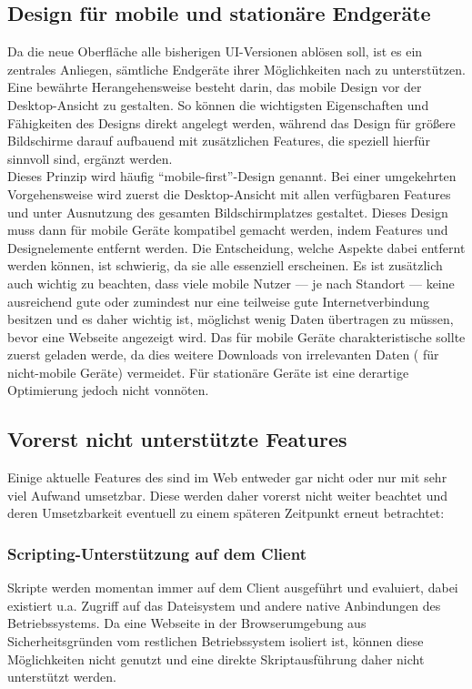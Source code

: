 \subsection{Design für mobile und stationäre Endgeräte}
Da die neue Oberfläche alle bisherigen UI-Versionen ablösen soll, ist es ein zentrales Anliegen, sämtliche Endgeräte ihrer Möglichkeiten nach zu unterstützen. Eine bewährte Herangehensweise besteht darin, das mobile Design vor der Desktop-Ansicht zu gestalten. So können die wichtigsten Eigenschaften und Fähigkeiten des Designs direkt angelegt werden, während das Design für größere Bildschirme darauf aufbauend mit zusätzlichen Features, die speziell hierfür sinnvoll sind, ergänzt werden.\\ Dieses Prinzip wird häufig \enquote{mobile-first}-Design genannt. Bei einer umgekehrten Vorgehensweise wird zuerst die Desktop-Ansicht mit allen verfügbaren Features und unter Ausnutzung des gesamten Bildschirmplatzes gestaltet. Dieses Design muss dann für mobile Geräte kompatibel gemacht werden, indem Features und Designelemente entfernt werden. Die Entscheidung, welche Aspekte dabei entfernt werden können, ist schwierig, da sie alle essenziell erscheinen.
Es ist zusätzlich auch wichtig zu beachten, dass viele mobile Nutzer --- je nach Standort --- keine ausreichend gute oder zumindest nur eine teilweise gute Internetverbindung besitzen und es daher wichtig ist, möglichst wenig Daten übertragen zu müssen, bevor eine Webseite angezeigt wird. Das für mobile Geräte charakteristische  sollte zuerst geladen werde, da dies weitere Downloads von irrelevanten Daten ( für nicht-mobile Geräte) vermeidet. Für stationäre Geräte ist eine derartige Optimierung jedoch nicht vonnöten.

\subsection{Vorerst nicht unterstützte Features}
Einige aktuelle Features des  sind im Web entweder gar nicht oder nur mit sehr viel Aufwand umsetzbar. Diese werden daher vorerst nicht weiter beachtet und deren Umsetzbarkeit eventuell zu einem späteren Zeitpunkt erneut betrachtet:

\subsubsection{Scripting-Unterstützung auf dem Client}
Skripte werden momentan immer auf dem Client ausgeführt und evaluiert, dabei existiert u.a. Zugriff auf das Dateisystem und andere native Anbindungen des Betriebssystems. Da eine Webseite in der Browserumgebung aus Sicherheitsgründen vom restlichen Betriebssystem isoliert ist, können diese Möglichkeiten nicht genutzt und eine direkte Skriptausführung daher nicht unterstützt werden. 

